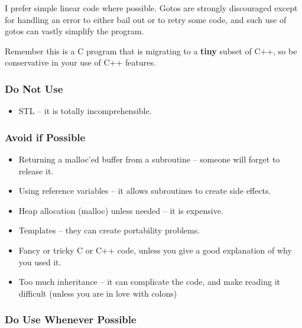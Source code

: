 I prefer simple linear code where possible. Gotos are strongly discouraged
except for handling an error to either bail out or to retry some code, and
such use of gotos can vastly simplify the program. 

Remember this is a C program that is migrating to a {\bf tiny} subset of C++,
so be conservative in your use of C++ features. 

\subsubsection*{Do Not Use}

\begin{itemize}
\item STL -- it is totally incomprehensible. 
   \end{itemize}

\subsubsection*{Avoid if Possible}

\begin{itemize}
\item Returning a malloc'ed buffer from a subroutine --  someone will forget
   to release it. 
\item Using reference variables -- it allows subroutines to  create side
   effects. 
\item Heap allocation (malloc) unless needed -- it is expensive. 
\item Templates -- they can create portability problems. 
\item Fancy or tricky C or C++ code, unless you give a  good explanation of
   why you used it. 
\item Too much inheritance -- it can complicate the code,  and make reading it
   difficult (unless you are in love  with colons) 
   \end{itemize}

\subsubsection*{Do Use Whenever Possible}

